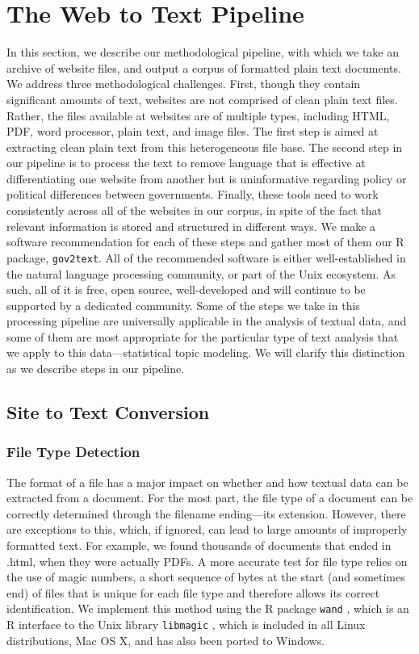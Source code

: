 \documentclass[11pt]{article}
\begin{document}
\section{The Web to Text Pipeline}
In this section, we describe our methodological pipeline, with which we take an archive of website files, and output a corpus of formatted plain text documents. We address three methodological challenges.  First, though they contain significant amounts of text, websites are not comprised of clean plain text files. Rather, the files available at websites are of multiple types, including HTML, PDF, word processor, plain text, and image files. The first step is aimed at extracting clean plain text from this heterogeneous file base. The second step in our pipeline is to process the text to remove language that is effective at differentiating one website from another but is uninformative regarding policy or political differences between governments. Finally, these tools need to work consistently across all of the websites in our corpus, in spite of the fact that relevant information is stored and structured in different ways. We make a software recommendation for each of these steps and gather most of them our R package, \texttt{gov2text}. All of the recommended software is either well-established in the natural language processing community, or part of the Unix ecosystem. As such, all of it is free, open source, well-developed and will continue to be supported by a dedicated community. Some of the steps we take in this processing pipeline are universally applicable in the analysis of textual data, and some of them are most appropriate for the particular type of text analysis that we apply to this data---statistical topic modeling. We will clarify this distinction as we describe steps in our pipeline.

\subsection{Site to Text Conversion}
\subsubsection{File Type Detection}
The format of a file has a major impact on whether and how textual data can be extracted from a document. For the most part, the file type of a document can be correctly determined through the filename ending---its extension. However, there are exceptions to this, which, if ignored, can lead to large amounts of improperly formatted text. For example, we found thousands of documents that ended in .html, when they were actually PDFs. A more accurate test for file type relies on the use of magic numbers, a short sequence of bytes at the start (and sometimes end) of files that is unique for each file type and therefore allows its correct identification. We implement this method using the R package \texttt{wand} \citep{wand}, which is an R interface to the Unix library \texttt{libmagic} \citep{darwin2008libmagic}, which is included in all Linux distributions, Mac OS X, and has also been ported to Windows.
\end{document}
